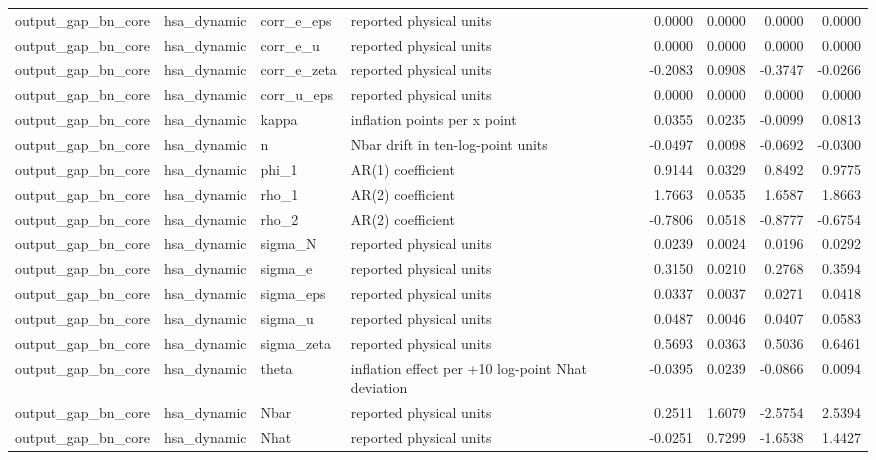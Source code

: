 \begin{tabular}{llllrrrr}
output\_gap\_bn\_core & hsa\_dynamic & corr\_e\_eps & reported physical units & 0.0000 & 0.0000 & 0.0000 & 0.0000 \\
output\_gap\_bn\_core & hsa\_dynamic & corr\_e\_u & reported physical units & 0.0000 & 0.0000 & 0.0000 & 0.0000 \\
output\_gap\_bn\_core & hsa\_dynamic & corr\_e\_zeta & reported physical units & -0.2083 & 0.0908 & -0.3747 & -0.0266 \\
output\_gap\_bn\_core & hsa\_dynamic & corr\_u\_eps & reported physical units & 0.0000 & 0.0000 & 0.0000 & 0.0000 \\
output\_gap\_bn\_core & hsa\_dynamic & kappa & inflation points per x point & 0.0355 & 0.0235 & -0.0099 & 0.0813 \\
output\_gap\_bn\_core & hsa\_dynamic & n & Nbar drift in ten-log-point units & -0.0497 & 0.0098 & -0.0692 & -0.0300 \\
output\_gap\_bn\_core & hsa\_dynamic & phi\_1 & AR(1) coefficient & 0.9144 & 0.0329 & 0.8492 & 0.9775 \\
output\_gap\_bn\_core & hsa\_dynamic & rho\_1 & AR(2) coefficient & 1.7663 & 0.0535 & 1.6587 & 1.8663 \\
output\_gap\_bn\_core & hsa\_dynamic & rho\_2 & AR(2) coefficient & -0.7806 & 0.0518 & -0.8777 & -0.6754 \\
output\_gap\_bn\_core & hsa\_dynamic & sigma\_N & reported physical units & 0.0239 & 0.0024 & 0.0196 & 0.0292 \\
output\_gap\_bn\_core & hsa\_dynamic & sigma\_e & reported physical units & 0.3150 & 0.0210 & 0.2768 & 0.3594 \\
output\_gap\_bn\_core & hsa\_dynamic & sigma\_eps & reported physical units & 0.0337 & 0.0037 & 0.0271 & 0.0418 \\
output\_gap\_bn\_core & hsa\_dynamic & sigma\_u & reported physical units & 0.0487 & 0.0046 & 0.0407 & 0.0583 \\
output\_gap\_bn\_core & hsa\_dynamic & sigma\_zeta & reported physical units & 0.5693 & 0.0363 & 0.5036 & 0.6461 \\
output\_gap\_bn\_core & hsa\_dynamic & theta & inflation effect per +10 log-point Nhat deviation & -0.0395 & 0.0239 & -0.0866 & 0.0094 \\
output\_gap\_bn\_core & hsa\_dynamic & Nbar & reported physical units & 0.2511 & 1.6079 & -2.5754 & 2.5394 \\
output\_gap\_bn\_core & hsa\_dynamic & Nhat & reported physical units & -0.0251 & 0.7299 & -1.6538 & 1.4427 \\

\end{tabular}
